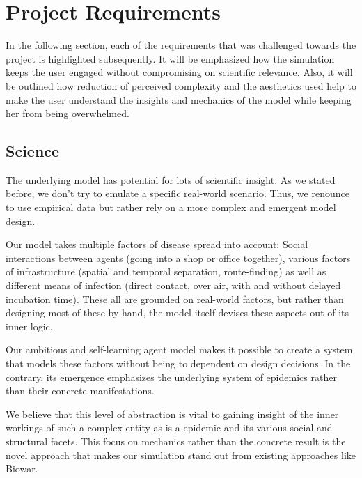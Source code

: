 \documentclass[table]{sig-alternate-05-2015}
\begin{document}
\section{Project Requirements}

In the following section, each of the requirements that was challenged towards the project is highlighted subsequently. It will be emphasized how the simulation keeps the user engaged without compromising on scientific relevance. Also, it will be outlined how reduction of perceived complexity and the aesthetics used help to make the user understand the insights and mechanics of the model while keeping her from being overwhelmed. 

\subsection{Science}

The underlying model has potential for lots of scientific insight. As we stated before, we don't try to emulate a specific real-world scenario. Thus, we renounce to use empirical data but rather rely on a more complex and emergent model design.

Our model takes multiple factors of disease spread into account: Social interactions between agents (going into a shop or office together), various factors of infrastructure (spatial and temporal separation, route-finding) as well as different means of infection (direct contact, over air, with and without delayed incubation time). These all are grounded on real-world factors, but rather than designing most of these by hand, the model itself devises these aspects out of its inner logic.

Our ambitious and self-learning agent model makes it possible to create a system that models these factors without being to dependent on design decisions. In the contrary, its emergence emphasizes the underlying system of epidemics rather than their concrete manifestations. 

We believe that this level of abstraction is vital to gaining insight of the inner workings of such a complex entity as is a epidemic and its various social and structural facets.
This focus on mechanics rather than the concrete result is the novel approach that makes our simulation stand out from existing approaches like Biowar.
\end{document}
